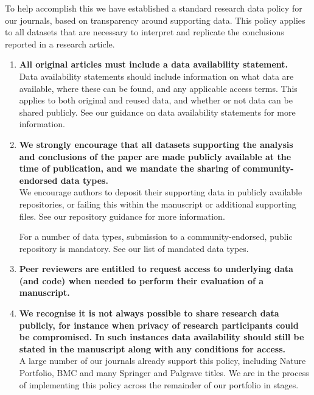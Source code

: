 \documentclass[11pt]{article}
\begin{document}
To help accomplish this we have established a standard research data policy for our journals, based on transparency around supporting data. This policy applies to all datasets that are necessary to interpret and replicate the conclusions reported in a research article.
\begin{enumerate}
	\item \textbf{All original articles must include a data availability statement.}\\
	
	Data availability statements should include information on what data are available, where these can be found, and any applicable access terms. This applies to both original and reused data, and whether or not data can be shared publicly. See our guidance on data availability statements for more information.
	
	\item \textbf{We strongly encourage that all datasets supporting the analysis and conclusions of the paper are made publicly available at the time of publication, and we mandate the sharing of community-endorsed data types.}\\
	
	We encourage authors to deposit their supporting data in publicly available repositories, or failing this within the manuscript or additional supporting files. See our repository guidance for more information.
	
	For a number of data types, submission to a community-endorsed, public repository is mandatory. See our list of mandated data types.
	
	\item \textbf{Peer reviewers are entitled to request access to underlying data (and code) when needed to perform their evaluation of a manuscript.}\\
	
	\item \textbf{We recognise it is not always possible to share research data publicly, for instance when privacy of research participants could be compromised. In such instances data availability should still be stated in the manuscript along with any conditions for access.}\\
	
	A large number of our journals already support this policy, including Nature Portfolio, BMC and many Springer and Palgrave titles. We are in the process of implementing this policy across the remainder of our portfolio in stages.
\end{enumerate}


\newpage


\end{document}
